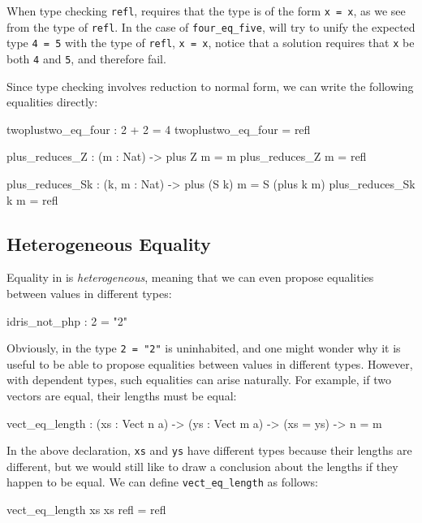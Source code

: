 When type checking \texttt{refl}, \Idris{} requires that the type is of
the form \texttt{x = x}, as we see from the type of \texttt{refl}. In the case
of \texttt{four\_eq\_five}, \Idris{} will try to unify the expected type
\texttt{4 = 5} with the type of \texttt{refl},
\texttt{x = x}, notice that a solution requires that \texttt{x} be both
\texttt{4} and \texttt{5}, and therefore fail.

Since type checking involves reduction to normal form, we can write the
following equalities directly:

\begin{code}
twoplustwo_eq_four : 2 + 2 = 4
twoplustwo_eq_four = refl

plus_reduces_Z : (m : Nat) -> plus Z m = m
plus_reduces_Z m = refl

plus_reduces_Sk : (k, m : Nat) -> plus (S k) m = S (plus k m)
plus_reduces_Sk k m = refl
\end{code}

\subsection{Heterogeneous Equality}

Equality in \Idris{} is \emph{heterogeneous}, meaning that 
we can even propose equalities between values in different types:

\begin{code}
idris_not_php : 2 = "2"
\end{code}

\noindent
Obviously, in \Idris{} the type \texttt{2 = "2"} is uninhabited, and one might
wonder why it is useful to be able to propose equalities between values in
different types. However, with dependent types, such equalities can arise
naturally. For example, if two vectors are equal, their lengths must be
equal:

\begin{code}
vect_eq_length : (xs : Vect n a) -> (ys : Vect m a) ->
                 (xs = ys) -> n = m
\end{code}

\noindent
In the above declaration, \texttt{xs} and \texttt{ys} have different types
because their lengths are different,
but we would still like to draw a conclusion about the lengths if they
happen to be equal. We can define \texttt{vect\_eq\_length} as follows:

\begin{code}
vect_eq_length xs xs refl = refl
\end{code}

